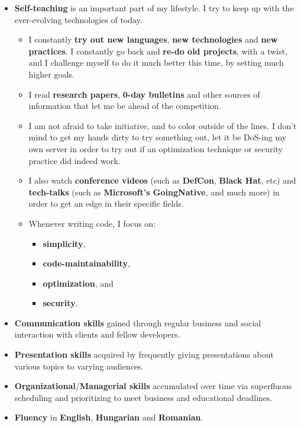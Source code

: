 \documentclass[11pt,a4paper]{article}
\begin{document}
\begin{itemize}
\begin{itemize}
\begin{itemize}
			\end{itemize}
		\end{itemize}
	\item	\textbf{Self-teaching} is an important part of my lifestyle. I try to keep up with the ever-evolving technologies of today.
		\begin{itemize}
		\item	I constantly \textbf{try out new languages}, \textbf{new technologies} and \textbf{new practices}. I constantly go back and \textbf{re-do old projects}, with a twist, and I challenge myself to do it much better this time, by setting much higher goals.
		\item	I read \textbf{research papers}, \textbf{0-day bulletins} and other sources of information that let me be ahead of the competition.
		\item	I am not afraid to take initiative, and to color outside of the lines. I don't mind to get my hands dirty to try something out, let it be DoS-ing my own server in order to try out if an optimization technique or security practice did indeed work.
		\item	I also watch \textbf{conference videos} (such as \textbf{DefCon}, \textbf{Black Hat}, etc) and \textbf{tech-talks} (such as \textbf{Microsoft's GoingNative}, and much more) in order to get an edge in their specific fields.
		\item	Whenever writing code, I focus on:
			\begin{itemize}
			\item	\textbf{simplicity},
			\item	\textbf{code-maintainability},
			\item	\textbf{optimization}, and
			\item	\textbf{security}.
			\end{itemize}
		\end{itemize}
	\item	\textbf{Communication skills} gained through regular business and social interaction with clients and fellow developers.
	\item	\textbf{Presentation skills} acquired by frequently giving presentations about various topics to varying audiences.
	\item	\textbf{Organizational}/\textbf{Managerial skills} accumulated over time via superfluous scheduling and prioritizing to meet business and educational deadlines.
	\item	\textbf{Fluency} in \textbf{English}, \textbf{Hungarian} and \textbf{Romanian}.
	\end{itemize}
\end{document}
